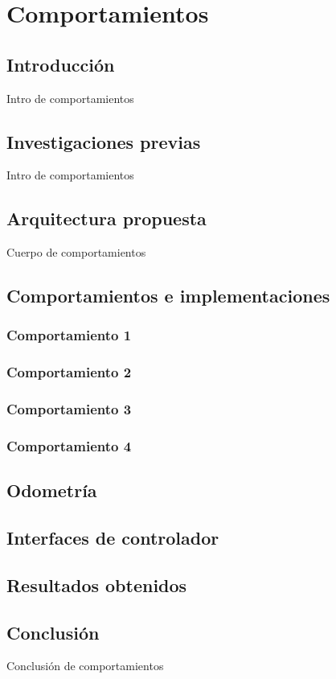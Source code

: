 \section{Comportamientos}

\subsection{Introducci\'on}
Intro de comportamientos

\subsection{Investigaciones previas}
Intro de comportamientos

\subsection{Arquitectura propuesta}
Cuerpo de comportamientos

\subsection{Comportamientos e implementaciones}

\subsubsection{Comportamiento 1}

\subsubsection{Comportamiento 2}

\subsubsection{Comportamiento 3}

\subsubsection{Comportamiento 4}

\subsection{Odometr\'ia}

\subsection{Interfaces de controlador}

\subsection{Resultados obtenidos}

\subsection{Conclusi\'on}
Conclusi\'on de comportamientos

